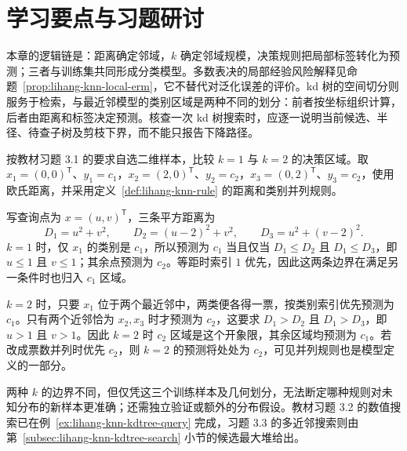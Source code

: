 \section{学习要点与习题研讨}
\label{sec:lihang-knn-review}

本章的逻辑链是：距离确定邻域，$k$ 确定邻域规模，决策规则把局部标签转化为预测；三者与训练集共同形成分类模型。多数表决的局部经验风险解释见命题~\ref{prop:lihang-knn-local-erm}，它不替代对泛化误差的评价。kd 树的空间切分则服务于检索，与最近邻模型的类别区域是两种不同的划分：前者按坐标组织计算，后者由距离和标签决定预测。核查一次 kd 树搜索时，应逐一说明当前候选、半径、待查子树及剪枝下界，而不能只报告下降路径。

\begin{example}
\label{ex:lihang-knn-partition-k}
按教材习题 3.1 的要求自选二维样本，比较 $k=1$ 与 $k=2$ 的决策区域。取 $x_1=(0,0)^\mathsf T$、$y_1=c_1$，$x_2=(2,0)^\mathsf T$、$y_2=c_2$，$x_3=(0,2)^\mathsf T$、$y_3=c_2$，使用欧氏距离，并采用定义~\ref{def:lihang-knn-rule} 的距离和类别并列规则。
\end{example}
\begin{solve}
写查询点为 $x=(u,v)^\mathsf T$，三条平方距离为
\[
  D_1=u^2+v^2,\qquad
  D_2=(u-2)^2+v^2,\qquad
  D_3=u^2+(v-2)^2.
\]
$k=1$ 时，仅 $x_1$ 的类别是 $c_1$，所以预测为 $c_1$ 当且仅当 $D_1\leq D_2$ 且 $D_1\leq D_3$，即 $u\leq1$ 且 $v\leq1$；其余点预测为 $c_2$。等距时索引 $1$ 优先，因此这两条边界在满足另一条件时也归入 $c_1$ 区域。

$k=2$ 时，只要 $x_1$ 位于两个最近邻中，两类便各得一票，按类别索引优先预测为 $c_1$。只有两个近邻恰为 $x_2,x_3$ 时才预测为 $c_2$，这要求 $D_1>D_2$ 且 $D_1>D_3$，即 $u>1$ 且 $v>1$。因此 $k=2$ 时 $c_2$ 区域是这个开象限，其余区域均预测为 $c_1$。若改成票数并列时优先 $c_2$，则 $k=2$ 的预测将处处为 $c_2$，可见并列规则也是模型定义的一部分。

两种 $k$ 的边界不同，但仅凭这三个训练样本及几何划分，无法断定哪种规则对未知分布的新样本更准确；还需独立验证或额外的分布假设。教材习题 3.2 的数值搜索已在例~\ref{ex:lihang-knn-kdtree-query} 完成，习题 3.3 的多近邻搜索则由第~\ref{subsec:lihang-knn-kdtree-search} 小节的候选最大堆给出。
\end{solve}





